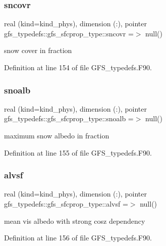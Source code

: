 \subsubsection{sncovr}
{\footnotesize\ttfamily real (kind=kind\+\_\+phys), dimension (\+:), pointer gfs\+\_\+typedefs\+::gfs\+\_\+sfcprop\+\_\+type\+::sncovr =$>$ null()}



snow cover in fraction 



Definition at line 154 of file G\+F\+S\+\_\+typedefs.\+F90.

\mbox{\label{structgfs__typedefs_1_1gfs__sfcprop__type_a19ce7eb0442956f8947db4e5c4f5c971}} 
\subsubsection{snoalb}
{\footnotesize\ttfamily real (kind=kind\+\_\+phys), dimension (\+:), pointer gfs\+\_\+typedefs\+::gfs\+\_\+sfcprop\+\_\+type\+::snoalb =$>$ null()}



maximum snow albedo in fraction 



Definition at line 155 of file G\+F\+S\+\_\+typedefs.\+F90.

\mbox{\label{structgfs__typedefs_1_1gfs__sfcprop__type_a6dc7926eb824bf21ac38261f438d23c4}} 
\subsubsection{alvsf}
{\footnotesize\ttfamily real (kind=kind\+\_\+phys), dimension  (\+:), pointer gfs\+\_\+typedefs\+::gfs\+\_\+sfcprop\+\_\+type\+::alvsf =$>$ null()}



mean vis albedo with strong cosz dependency 



Definition at line 156 of file G\+F\+S\+\_\+typedefs.\+F90.

\mbox{\label{structgfs__typedefs_1_1gfs__sfcprop__type_a0736a3db76fa0a4f29b786dbaf1c4d40}} 
